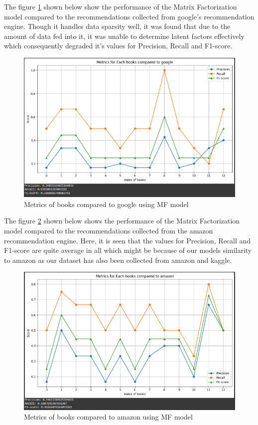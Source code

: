     The figure \ref{Metrics-mf-google} shown below show the performance of the Matrix Factorization model compared to the recommendations collected from google's recommendation engine. Though it handles data sparsity well, it was found that due to the amount of data fed into it, it was unable to determine latent factors effectively which consequently degraded it's values for Precision, Recall and F1-score.

    \begin{figure}[h]
        \centering
        \includegraphics[width=1\linewidth]{img/Graphics/MF_model_google.PNG}
        \caption{Metrics of books compared to google using MF model}
        \label{Metrics-mf-google}
    \end{figure}
    \newpage

    The figure \ref{Metrics-mf-amazon} shown below shows the performance of the Matrix Factorization model compared to the recommendations collected from the amazon recommendation engine. Here, it is seen that the values for Precision, Recall and F1-score are quite average in all which might be because of our models similarity to amazon as our dataset has also been collected from amazon and kaggle.

    \begin{figure}[h]
        \centering
        \includegraphics[width=1\linewidth]{img/Graphics/MF_model_amazon.PNG}
        \caption{Metrics of books compared to amazon using MF model}
        \label{Metrics-mf-amazon}
    \end{figure}

